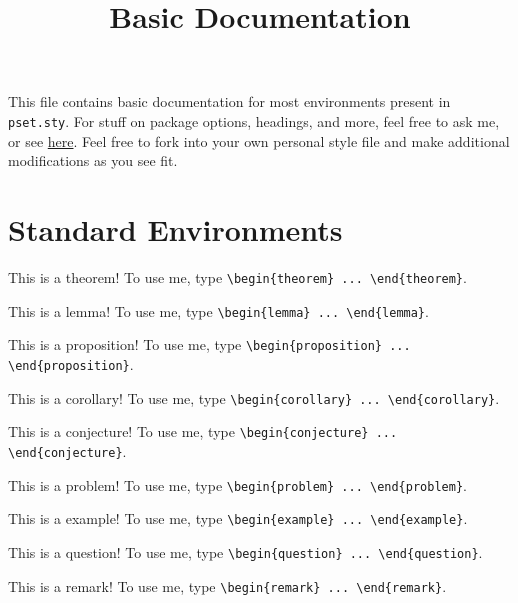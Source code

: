 \documentclass{scrartcl}
\title{Basic Documentation}
\begin{document}
\maketitle

This file contains basic documentation for most environments present in \verb#pset.sty#. For stuff on package options, headings, and more, feel free to ask me, or see \href{https://github.com/eje24/style}{here}. Feel free to fork into your own personal style file and make additional modifications as you see fit.

\tableofcontents


\section{Standard Environments}
\begin{theorem}
    This is a theorem!  To use me, type \verb#\begin{theorem} ... \end{theorem}#.
\end{theorem}
\begin{lemma}
    This is a lemma!  To use me, type \verb#\begin{lemma} ... \end{lemma}#.
\end{lemma}
\begin{proposition}
    This is a proposition! To use me, type \verb#\begin{proposition} ... \end{proposition}#.
\end{proposition}
\begin{corollary}
    This is a corollary! To use me, type \verb#\begin{corollary} ... \end{corollary}#.
\end{corollary}
\begin{conjecture}
    This is a conjecture! To use me, type \verb#\begin{conjecture} ... \end{conjecture}#.
\end{conjecture}
\begin{problem}
    This is a problem! To use me, type \verb#\begin{problem} ... \end{problem}#.
\end{problem}
\begin{example}
    This is a example! To use me, type \verb#\begin{example} ... \end{example}#.
\end{example}
\begin{question}
    This is a question! To use me, type \verb#\begin{question} ... \end{question}#.
\end{question}
\begin{remark}
    This is a remark! To use me, type \verb#\begin{remark} ... \end{remark}#.
\end{remark}
\end{document}
